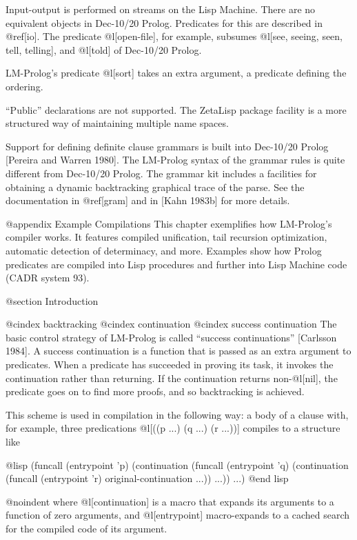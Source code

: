 {Input-output is performed on streams on the Lisp Machine. There are no
equivalent objects in Dec-10/20 Prolog. Predicates for
this are described in @ref[io].  The predicate @l[open-file], for
example, subsumes @l[see, seeing, seen, tell, telling], and @l[told]
of Dec-10/20 Prolog.

LM-Prolog's predicate @l[sort] takes an extra argument, a predicate
defining the ordering.

``Public'' declarations are not supported. The ZetaLisp package
facility is a more structured way of maintaining multiple name spaces.

Support for defining definite clause grammars is built into Dec-10/20
Prolog [Pereira and Warren 1980].  The LM-Prolog syntax of the grammar
rules is quite different from Dec-10/20 Prolog. The grammar kit
includes a facilities for obtaining a dynamic backtracking graphical
trace of the parse.  See the documentation in @ref[gram] and in [Kahn
1983b] for more details.

@appendix Example Compilations
This chapter exemplifies how LM-Prolog's compiler works.  It features
compiled unification, tail recursion optimization, automatic detection
of determinacy, and more.
Examples show how Prolog predicates are compiled into Lisp procedures and
further into Lisp Machine code (CADR system 93).

@section Introduction

@cindex backtracking
@cindex continuation
@cindex success continuation
The basic control strategy of LM-Prolog is called
``success continuations'' [Carlsson 1984].  
A success continuation is a function that is passed
as an extra argument to predicates.  
When a predicate has succeeded in proving its task, 
it invokes the continuation rather than returning.  If the continuation 
returns non-@l[nil], the predicate goes on to find more proofs, 
and so backtracking is achieved.

This scheme is used in compilation in the following way: a body of a clause
with, for example, three predications @l[((p ...) (q ...) (r ...))]
compiles to a structure like

@lisp
(funcall (entrypoint 'p)
         (continuation
           (funcall (entrypoint 'q)
                    (continuation
                      (funcall (entrypoint 'r)
                               original-continuation ...))
                               ...))
         ...)
@end lisp


@noindent
where @l[continuation] is a macro 
that expands its arguments to a function
of zero arguments, and @l[entrypoint] macro-expands to a
cached search for the compiled code of its argument.

}
